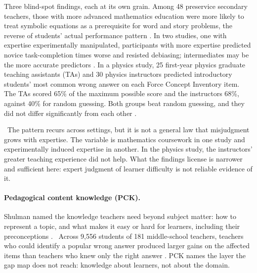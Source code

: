 \begin{evlitbox}
  Three blind-spot findings, each at its own grain. Among 48 preservice
  secondary teachers, those with more advanced mathematics
  education were more likely to treat symbolic equations as a prerequisite
  for word and story problems, the reverse of students' actual performance
  pattern \parencite{nathan2003expert}. In two studies, one with expertise
  experimentally manipulated, participants with more expertise predicted
  novice task-completion times worse and resisted debiasing; intermediates
  may be the more accurate predictors \parencite{hinds1999curse}. In a physics study, 25
  first-year physics graduate teaching assistants (TAs) and 30 physics
  instructors predicted introductory students' most common wrong answer on
  each Force Concept Inventory item. The TAs scored 65\% of the maximum
  possible score and the instructors 68\%, against 40\% for random guessing.
  Both groups beat random guessing, and they did not differ significantly
  from each other \parencite{maries2016teaching}.
\end{evlitbox}

\evint\ The pattern recurs across settings, but it is not a general law that
misjudgment grows with expertise. The variable is mathematics coursework in
one study and experimentally induced expertise in another. In the physics
study, the instructors' greater teaching experience did not help. What the findings license is
narrower and sufficient here: expert judgment of learner difficulty is not
reliable evidence of it.

\paragraph{Pedagogical content knowledge (PCK).} Shulman named the knowledge
teachers need beyond subject matter: how to represent a topic, and what
makes it easy or hard for learners, including their preconceptions
\parencite{shulman1986those,shulman1987knowledge}. \evlit\ Across 9,556
students of 181 middle-school teachers, teachers who could identify a popular
wrong answer produced larger gains on the affected items than teachers who
knew only the right answer \parencite{sadler2013influence}. PCK names the
layer the gap map does not reach: knowledge about learners, not about the
domain.

